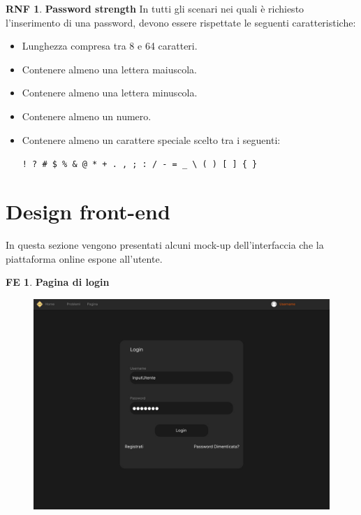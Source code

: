\documentclass[11pt, a4paper]{article}
\theoremstyle{definition}
\newtheorem{nonfuncreq}{RNF} %
\newtheorem{frontend}{FE}
\begin{document}
\begin{nonfuncreq}
\label{legalpassword}
\textbf{Password strength }
In tutti gli scenari nei quali è richiesto l'inserimento di una password,
devono essere rispettate le seguenti caratteristiche:
\begin{itemize}
    \item Lunghezza compresa tra 8 e 64 caratteri.
    \item Contenere almeno una lettera maiuscola.
    \item Contenere almeno una lettera minuscola.
    \item Contenere almeno un numero.
    \item Contenere almeno un carattere speciale scelto tra i
    seguenti:
    \begin{center}
        \verb|! ? # $ % & @ * + . , ; : / - = _ \ ( ) [ ] { }|
    \end{center}
\end{itemize}
\end{nonfuncreq}




\newpage
\section{Design front-end}
In questa sezione vengono presentati alcuni mock-up dell'interfaccia che
la piattaforma online espone all'utente.

\begin{frontend}
\textbf{Pagina di login }
\end{frontend}
\begin{figure}[H]
\centering
\includegraphics[scale=0.25]{./immaginife/login.jpeg}
\end{figure}
\end{document}
